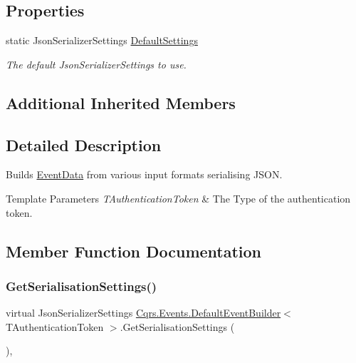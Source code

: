 \subsection*{Properties}
\begin{DoxyCompactItemize}
\item 
static Json\+Serializer\+Settings \hyperlink{classCqrs_1_1Events_1_1DefaultEventBuilder_aabead59863bacfed527d85ea789ab881_aabead59863bacfed527d85ea789ab881}{Default\+Settings}
\begin{DoxyCompactList}\small\item\em The default Json\+Serializer\+Settings to use. \end{DoxyCompactList}\end{DoxyCompactItemize}
\subsection*{Additional Inherited Members}


\subsection{Detailed Description}
Builds \hyperlink{classCqrs_1_1Events_1_1EventData}{Event\+Data} from various input formats serialising J\+S\+ON. 


\begin{DoxyTemplParams}{Template Parameters}
{\em T\+Authentication\+Token} & The Type of the authentication token.\\
\hline
\end{DoxyTemplParams}


\subsection{Member Function Documentation}
\mbox{\label{classCqrs_1_1Events_1_1DefaultEventBuilder_a49be2758fa32166f1b95e8c0eb9355d1_a49be2758fa32166f1b95e8c0eb9355d1}} 
\subsubsection{\texorpdfstring{Get\+Serialisation\+Settings()}{GetSerialisationSettings()}}
{\footnotesize\ttfamily virtual Json\+Serializer\+Settings \hyperlink{classCqrs_1_1Events_1_1DefaultEventBuilder}{Cqrs.\+Events.\+Default\+Event\+Builder}$<$ T\+Authentication\+Token $>$.Get\+Serialisation\+Settings (\begin{DoxyParamCaption}{ }\end{DoxyParamCaption})\hspace{0.3cm}{\ttfamily [protected]}, {\ttfamily [virtual]}}



